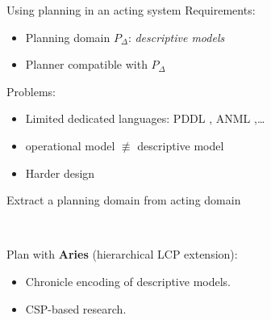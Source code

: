 \begin{frame}{Using planning in an acting system}
    Requirements:
    \begin{itemize}
        \item Planning domain $P_\Delta$: \textit{descriptive models}
        \item Planner compatible with $P_\Delta$
    \end{itemize}
    Problems: 
    \begin{itemize}
        \item Limited dedicated languages: PDDL \cite{foxPDDL2ExtensionPDDL2003}, ANML \cite{smith2008anml},\dots
        \item operational model $\not\equiv$ descriptive model
        \item Harder design 
    \end{itemize}

\end{frame}
\begin{frame}[c]{Extract a planning domain from acting domain}
    \centering

    ~

    Plan with \textbf{Aries} (hierarchical LCP\cite{bit-monnotConstraintBasedEncodingDomainIndependent2018} extension):
    \begin{itemize}
        \item Chronicle encoding of descriptive models.
        \item CSP-based research. 
    \end{itemize}

\end{frame}

